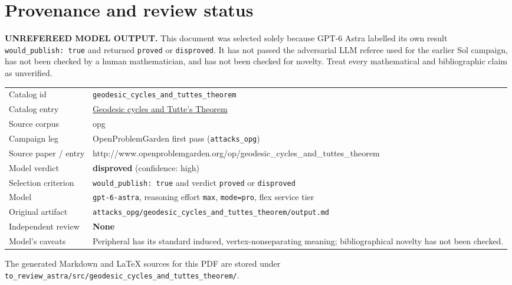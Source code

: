 \documentclass[
  11pt,
  a4paper,
]{article}
\newcounter{none} %
\begin{document}
\appendix

\section{Provenance and review
status}\label{provenance-and-review-status}

\begin{warning}

\textbf{UNREFEREED MODEL OUTPUT.} This document was selected solely
because GPT-6 Astra labelled its own result
\texttt{would\_publish:\ true} and returned \texttt{proved} or
\texttt{disproved}. It has not passed the adversarial LLM referee used
for the earlier Sol campaign, has not been checked by a human
mathematician, and has not been checked for novelty. Treat every
mathematical and bibliographic claim as unverified.

\end{warning}

{\def\LTcaptype{none} %
\begin{longtable}[]{@{}
  >{\raggedright\arraybackslash}p{}
  >{\raggedright\arraybackslash}p{}@{}}
\toprule\noalign{}
\endhead
\bottomrule\noalign{}
\endlastfoot
Catalog id & \texttt{geodesic\_cycles\_and\_tuttes\_theorem} \\
Catalog entry &
\href{https://graph-theory-ai.github.io/graph-conjectures/op/geodesic_cycles_and_tuttes_theorem/}{Geodesic
cycles and Tutte's Theorem} \\
Source corpus & opg \\
Campaign leg & OpenProblemGarden first pass (\texttt{attacks\_opg}) \\
Source paper / entry &
http://www.openproblemgarden.org/op/geodesic\_cycles\_and\_tuttes\_theorem \\
Model verdict & \textbf{disproved} (confidence: high) \\
Selection criterion & \texttt{would\_publish:\ true} and verdict
\texttt{proved} or \texttt{disproved} \\
Model & \texttt{gpt-6-astra}, reasoning effort \texttt{max},
\texttt{mode=pro}, flex service tier \\
Original artifact &
\texttt{attacks\_opg/geodesic\_cycles\_and\_tuttes\_theorem/output.md} \\
Independent review & \textbf{None} \\
Model's caveats & Peripheral has its standard induced,
vertex-nonseparating meaning; bibliographical novelty has not been
checked. \\
\end{longtable}
}

The generated Markdown and LaTeX sources for this PDF are stored under
\texttt{to\_review\_astra/src/geodesic\_cycles\_and\_tuttes\_theorem/}.
\end{document}
